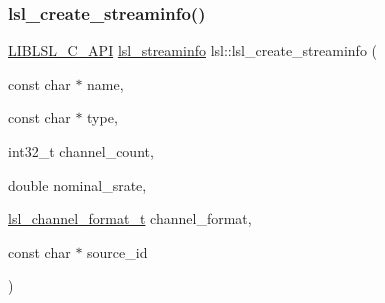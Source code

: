 \subsubsection{\texorpdfstring{lsl\+\_\+create\+\_\+streaminfo()}{lsl\_create\_streaminfo()}}
{\footnotesize\ttfamily \hyperlink{lsl__cpp_8h_aafd0ef1813e8be84a1420c4f1df64615}{L\+I\+B\+L\+S\+L\+\_\+\+C\+\_\+\+A\+PI} \hyperlink{namespacelsl_aa0a9ce9956061679949daa2e35aae2e8}{lsl\+\_\+streaminfo} lsl\+::lsl\+\_\+create\+\_\+streaminfo (\begin{DoxyParamCaption}\item[{const char $\ast$}]{name,  }\item[{const char $\ast$}]{type,  }\item[{int32\+\_\+t}]{channel\+\_\+count,  }\item[{double}]{nominal\+\_\+srate,  }\item[{\hyperlink{namespacelsl_af188e978739868560b53dbf0ddd58e66}{lsl\+\_\+channel\+\_\+format\+\_\+t}}]{channel\+\_\+format,  }\item[{const char $\ast$}]{source\+\_\+id }\end{DoxyParamCaption})}

